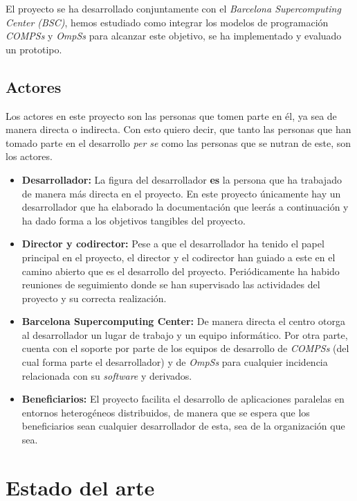 El proyecto se ha desarrollado conjuntamente con el \textit{Barcelona Supercomputing Center (BSC)}, hemos estudiado como integrar los modelos de programación \textit{COMPSs} y \textit{OmpSs} para alcanzar este objetivo, se ha implementado y evaluado un prototipo.

\subsection{Actores}

Los actores en este proyecto son las personas que tomen parte en él, ya sea de manera directa o indirecta. Con esto quiero decir, que tanto las personas que han tomado parte en el desarrollo \textit{per se} como las personas que se nutran de este, son los actores.

\begin{itemize}
 \item \textbf{Desarrollador:} La figura del desarrollador \textbf{es} la persona que ha trabajado de manera más directa en el proyecto. En este proyecto únicamente hay un desarrollador que ha elaborado la documentación que leerás a continuación y ha dado forma a los objetivos tangibles del proyecto.  
 \item \textbf{Director y codirector:} Pese a que el desarrollador ha tenido el papel principal en el proyecto, el director y el codirector han guiado a este en el camino abierto que es el desarrollo del proyecto. Periódicamente ha habido reuniones de seguimiento donde se han supervisado las actividades del proyecto y su correcta realización.
 \item \textbf{Barcelona Supercomputing Center:} De manera directa el centro otorga al desarrollador un lugar de trabajo y un equipo informático. Por otra parte, cuenta con el soporte por parte de los equipos de desarrollo de \textit{COMPSs} (del cual forma parte el desarrollador) y de \textit{OmpSs} para cualquier incidencia relacionada con su \textit{software} y derivados.
 \item \textbf{Beneficiarios:} El proyecto facilita el desarrollo de aplicaciones paralelas en entornos heterogéneos distribuidos, de manera que se espera que los beneficiarios sean cualquier desarrollador de esta, sea de la organización que sea.
\end{itemize}

\section{Estado del arte}

